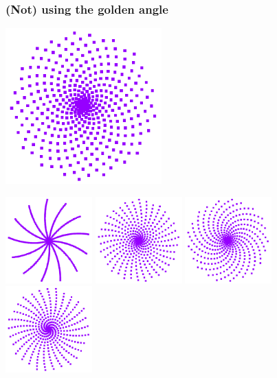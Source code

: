 \documentclass[12pt,compress,english,utf8,t]{beamer}
\begin{document}
\begin{frame}\frametitle{(Not) using the golden angle}
  \centering
  \includegraphics[width=0.45\textwidth]{drehwinkel-400-1_61803398874989484820.pdf}

  \includegraphics[width=0.25\textwidth]{drehwinkel-400-1_61525621097211707043.pdf}
  \includegraphics[width=0.25\textwidth]{drehwinkel-400-1_61775621097211707043.pdf}
  \includegraphics[width=0.25\textwidth]{drehwinkel-400-1_61831176652767262597.pdf}
  \includegraphics[width=0.25\textwidth]{drehwinkel-400-1_62081176652767262597.pdf}
  \par
\end{frame}
\end{document}
